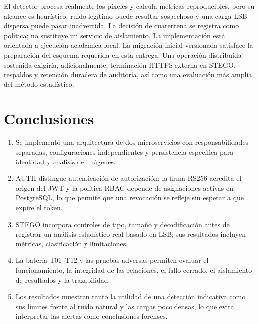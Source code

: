 \documentclass[11pt,a4paper,oneside]{article}
\begin{document}
El detector procesa realmente los píxeles y calcula métricas reproducibles, pero su alcance es heurístico: ruido legítimo puede resultar sospechoso y una carga LSB dispersa puede pasar inadvertida. La decisión de cuarentena se registra como política; no sustituye un servicio de aislamiento. La implementación está orientada a ejecución académica local. La migración inicial versionada satisface la preparación del esquema requerida en esta entrega. Una operación distribuida sostenida exigiría, adicionalmente, terminación HTTPS externa en STEGO, respaldos y retención duradera de auditoría, así como una evaluación más amplia del método estadístico.

\section{Conclusiones}
\begin{enumerate}
\item Se implementó una arquitectura de dos microservicios con responsabilidades separadas, configuraciones independientes y persistencia específica para identidad y análisis de imágenes.
\item AUTH distingue autenticación de autorización: la firma RS256 acredita el origen del JWT y la política RBAC depende de asignaciones activas en PostgreSQL, lo que permite que una revocación se refleje sin esperar a que expire el token.
\item STEGO incorpora controles de tipo, tamaño y decodificación antes de registrar un análisis estadístico real basado en LSB; sus resultados incluyen métricas, clasificación y limitaciones.
\item La batería T01--T12 y las pruebas adversas permiten evaluar el funcionamiento, la integridad de las relaciones, el fallo cerrado, el aislamiento de resultados y la trazabilidad.
\item Los resultados muestran tanto la utilidad de una detección indicativa como sus límites frente al ruido natural y las cargas poco densas, lo que evita interpretar las alertas como conclusiones forenses.
\end{enumerate}
\end{document}
